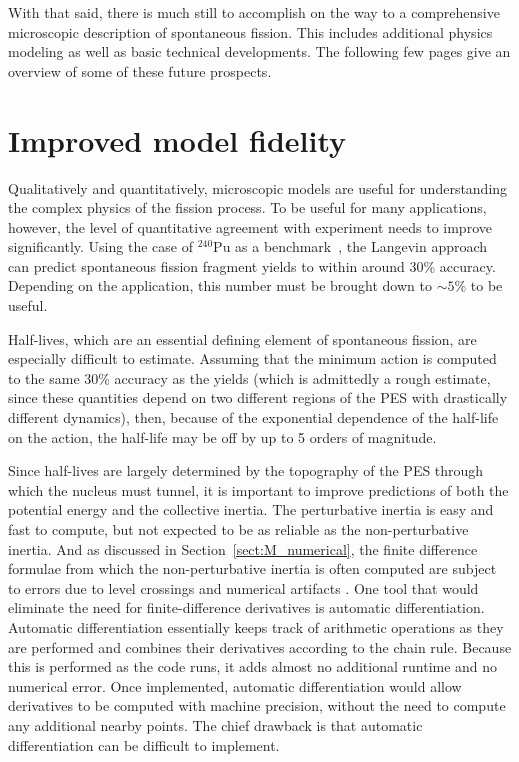 With that said, there is much still to accomplish on the way to a comprehensive microscopic description of spontaneous fission. This includes additional physics modeling as well as basic technical developments. The following few pages give an overview of some of these future prospects.

\section{Improved model fidelity}
Qualitatively and quantitatively, microscopic models are useful for understanding the complex physics of the fission process. To be useful for many applications, however, the level of quantitative agreement with experiment needs to improve significantly. Using the case of $^{240}$Pu as a benchmark~\cite{Sadhukhan2016}, the Langevin approach can predict spontaneous fission fragment yields to within around 30\% accuracy. Depending on the application, this number must be brought down to ${\sim}5\%$ to be useful.

Half-lives, which are an essential defining element of spontaneous fission, are especially difficult to estimate. Assuming that the minimum action is computed to the same 30\% accuracy as the yields (which is admittedly a rough estimate, since these quantities depend on two different regions of the PES with drastically different dynamics), then, because of the exponential dependence of the half-life on the action, the half-life may be off by up to 5 orders of magnitude.



Since half-lives are largely determined by the topography of the PES through which the nucleus must tunnel, it is important to improve predictions of both the potential energy and the collective inertia. The perturbative inertia is easy and fast to compute, but not expected to be as reliable as the non-perturbative inertia. And as discussed in Section~\ref{sect:M_numerical}, the finite difference formulae from which the non-perturbative inertia is often computed are subject to errors due to level crossings and numerical artifacts . One tool that would eliminate the need for finite-difference derivatives is automatic differentiation. Automatic differentiation essentially keeps track of arithmetic operations as they are performed and combines their derivatives according to the chain rule. Because this is performed as the code runs, it adds almost no additional runtime and no numerical error. Once implemented, automatic differentiation would allow derivatives to be computed with machine precision, without the need to compute any additional nearby points. The chief drawback is that automatic differentiation can be difficult to implement.

